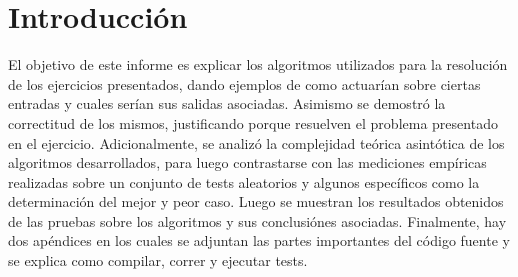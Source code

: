 \section{Introducci\'on}
El objetivo de este informe es explicar los algoritmos utilizados para la resoluci\'on de los ejercicios presentados, dando ejemplos de como actuar\'ian sobre ciertas entradas y cuales ser\'ian sus salidas asociadas. Asimismo se demostr\'o la correctitud de los mismos, justificando porque resuelven el problema presentado en el ejercicio. Adicionalmente, se analiz\'o la complejidad te\'orica asint\'otica de los algoritmos desarrollados, para luego contrastarse con las mediciones emp\'iricas realizadas sobre un conjunto de tests aleatorios y algunos espec\'ificos como la determinaci\'on del mejor y peor caso. Luego se muestran los resultados obtenidos de las pruebas sobre los algoritmos y sus conclusi\'ones asociadas. Finalmente, hay dos ap\'endices en los cuales se adjuntan las partes importantes del c\'odigo fuente y se explica como compilar, correr y ejecutar tests.
